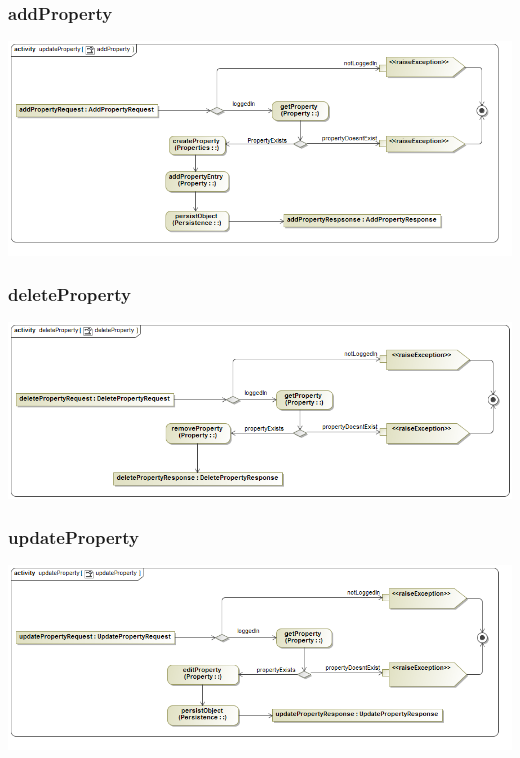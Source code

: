 \documentclass[a4paper,12pt]{article}
\begin{document}
\subsubsection{addProperty}
\includegraphics[width=1\textwidth]{./Images/processSpecification/addProperty.png}
\subsubsection{deleteProperty}
\includegraphics[width=1\textwidth]{./Images/processSpecification/deleteProperty.png}
\subsubsection{updateProperty}
\includegraphics[width=1\textwidth]{./Images/processSpecification/updateProperty.png}
\end{document}

